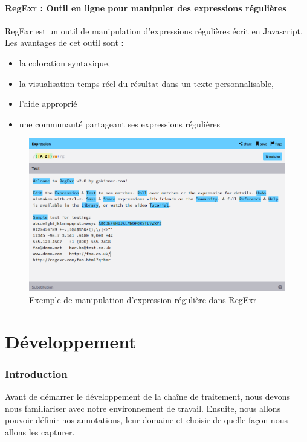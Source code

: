 \documentclass[a4paper, 11pt]{report}
\begin{document}
\subsection{RegExr : Outil en ligne pour manipuler des expressions régulières}
RegExr est un outil de manipulation d’expressions régulières écrit en Javascript.
Les avantages de cet outil sont : 
\begin{itemize}
\item la coloration syntaxique,
\item la visualisation temps réel du résultat dans un texte personnalisable,
\item l'aide approprié
\item une communauté partageant ses expressions régulières
\end{itemize}
\begin{figure}[h]
\begin{center}
\includegraphics[scale=0.3]{img/regexr.png} 
\end{center}
\caption{Exemple de manipulation d'expression régulière dans RegExr}
\end{figure}
		



\part{Développement}
	\section*{Introduction}
	Avant de démarrer le développement de la chaîne de traitement, nous devons nous familiariser avec notre environnement de travail. Ensuite, nous allons pouvoir définir nos annotations, leur domaine et choisir de quelle façon nous allons les capturer.
\end{document}
